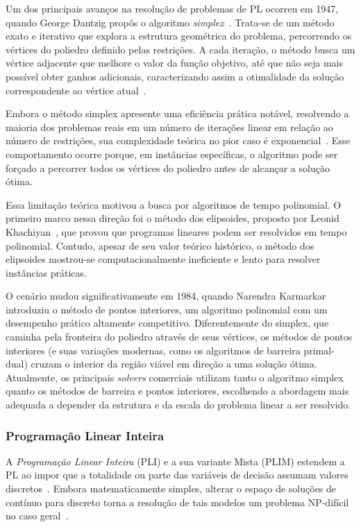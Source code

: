 Um dos principais avanços na resolução de problemas de PL ocorreu em 1947, quando George Dantzig propôs o algoritmo \emph{simplex}~\cite{Nash2000}. Trata-se de um método exato e iterativo que explora a estrutura geométrica do problema, percorrendo os vértices do poliedro definido pelas restrições. A cada iteração, o método busca um vértice adjacente que melhore o valor da função objetivo, até que não seja mais possível obter ganhos adicionais, caracterizando assim a otimalidade da solução correspondente ao vértice atual~\cite{Goldbarg2005}.

Embora o método simplex apresente uma eficiência prática notável, resolvendo a maioria dos problemas reais em um número de iterações linear em relação ao número de restrições, sua complexidade teórica no pior caso é exponencial~\cite{klee1972}. Esse comportamento ocorre porque, em instâncias específicas, o algoritmo pode ser forçado a percorrer todos os vértices do poliedro antes de alcançar a solução ótima.

Essa limitação teórica motivou a busca por algoritmos de tempo polinomial. O primeiro marco nessa direção foi o método dos elipsoides, proposto por Leonid Khachiyan~\cite{khachiyan1979}, que provou que programas lineares podem ser resolvidos em tempo polinomial. Contudo, apesar de seu valor teórico histórico, o método dos elipsoides mostrou-se computacionalmente ineficiente e lento para resolver instâncias práticas.

O cenário mudou significativamente em 1984, quando Narendra Karmarkar~\cite{karmarkar1984} introduziu o método de pontos interiores, um algoritmo polinomial com um desempenho prático altamente competitivo. Diferentemente do simplex, que caminha pela fronteira do poliedro através de seus vértices, os métodos de pontos interiores (e suas variações modernas, como os algoritmos de barreira primal-dual) cruzam o interior da região viável em direção a uma solução ótima. Atualmente, os principais \emph{solvers} comerciais utilizam tanto o algoritmo simplex quanto os métodos de barreira e pontos interiores, escolhendo a abordagem mais adequada a depender da estrutura e da escala do problema linear a ser resolvido.

\subsubsection{Programação Linear Inteira}

A \textit{Programação Linear Inteira} (PLI) e a sua variante Mista (PLIM) estendem a PL ao impor que a totalidade ou parte das variáveis de decisão assumam valores discretos~\cite{Nemhauser1988}. Embora matematicamente simples, alterar o espaço de soluções de contínuo para discreto torna a resolução de tais modelos um problema NP-difícil no caso geral~\cite{Schrijver1986}.


